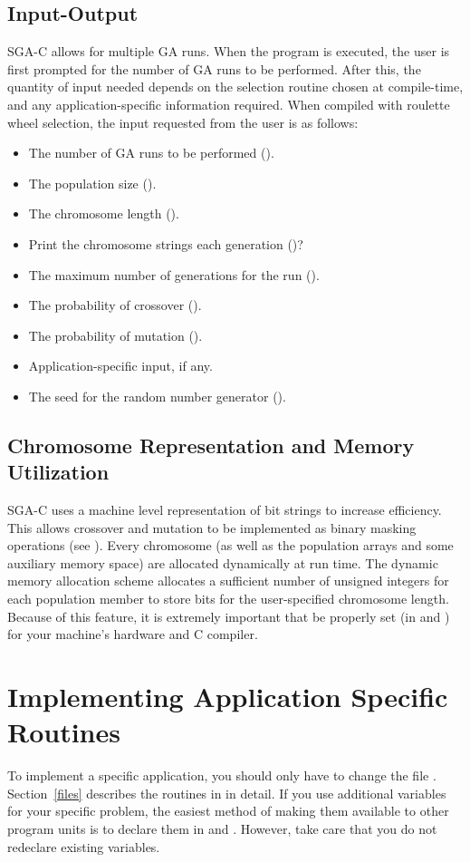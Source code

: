 \subsection{Input-Output}
SGA-C allows for multiple GA runs.
When the program is executed, the user is first prompted
for the number of GA runs to be
performed.  After this, the quantity of input needed depends on 
the selection routine chosen at compile-time, and any
application-specific information required.  
When compiled
with roulette wheel selection, 
the input requested from the user is as follows:
\begin{itemize}
\item The number of GA runs to be performed ({}).
\item The population size ({}).
\item The chromosome length ({}).
\item Print the chromosome strings each generation ({})?
\item The maximum number of generations for the run ({}).
\item The probability of crossover ({}).
\item The probability of mutation ({}).
\item Application-specific input, if any.
\item The seed for the random number generator ({}).
\end{itemize}

\subsection{Chromosome Representation and Memory Utilization}
\label{memstuff}
SGA-C uses a machine level representation of bit strings
to increase efficiency.
This allows crossover and mutation to be implemented 
as binary masking operations (see {}).
Every chromosome (as well as the population arrays and some
auxiliary memory space) are allocated dynamically at run
time. The dynamic memory allocation scheme allocates
a sufficient number of unsigned integers for each population member
to store bits for the user-specified chromosome length. Because
of this feature, it is extremely important that {}
be properly set (in
{} and {})
for your machine's hardware and C compiler.

\section{Implementing Application Specific Routines}
\label{app}
To implement a specific application, you should only have to change the file
{}.
Section~\ref{files} describes the routines in {} in detail.
If you use additional variables for your specific problem, the easiest method
of making them available to other program units is to declare them in 
{} and {}.  However, take care that you do not
redeclare existing variables.

